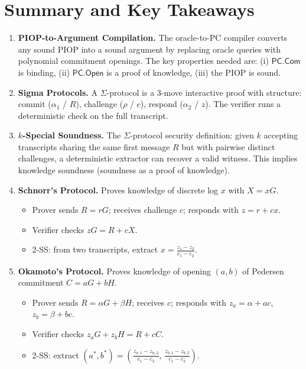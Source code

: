 \documentclass[11pt]{article}
\theoremstyle{plain}
\theoremstyle{definition}
\begin{document}
\section{Summary and Key Takeaways}

\begin{tcolorbox}[colback=blue!5!white, colframe=blue!60!black, title={Lecture Summary}]
\begin{enumerate}
  \item \textbf{PIOP-to-Argument Compilation.} The oracle-to-PC compiler converts any sound PIOP into a sound argument by replacing oracle queries with polynomial commitment openings. The key properties needed are: (i) $\mathsf{PC.Com}$ is binding, (ii) $\mathsf{PC.Open}$ is a proof of knowledge, (iii) the PIOP is sound.

  \item \textbf{Sigma Protocols.} A $\Sigma$-protocol is a 3-move interactive proof with structure: commit ($\alpha_1$ / $R$), challenge ($\rho$ / $c$), respond ($\alpha_2$ / $z$). The verifier runs a deterministic check on the full transcript.

  \item \textbf{$k$-Special Soundness.} The $\Sigma$-protocol security definition: given $k$ accepting transcripts sharing the same first message $R$ but with pairwise distinct challenges, a deterministic extractor can recover a valid witness. This implies knowledge soundness (soundness as a proof of knowledge).

  \item \textbf{Schnorr's Protocol.} Proves knowledge of discrete log $x$ with $X = xG$.
    \begin{itemize}
      \item Prover sends $R = rG$; receives challenge $c$; responds with $z = r + cx$.
      \item Verifier checks $zG = R + cX$.
      \item 2-SS: from two transcripts, extract $x = \frac{z_1 - z_2}{c_1 - c_2}$.
    \end{itemize}

  \item \textbf{Okamoto's Protocol.} Proves knowledge of opening $(a,b)$ of Pedersen commitment $C = aG + bH$.
    \begin{itemize}
      \item Prover sends $R = \alpha G + \beta H$; receives $c$; responds with $z_a = \alpha + ac$, $z_b = \beta + bc$.
      \item Verifier checks $z_a G + z_b H = R + cC$.
      \item 2-SS: extract $(a^*, b^*) = \left(\frac{z_{a,1}-z_{a,2}}{c_1-c_2},\, \frac{z_{b,1}-z_{b,2}}{c_1-c_2}\right)$.
    \end{itemize}


\end{enumerate}
\end{tcolorbox}
\end{document}
